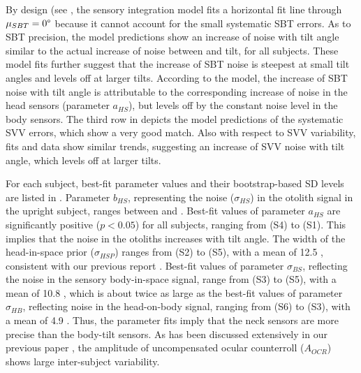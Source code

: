 By design (see , the sensory integration model fits a horizontal fit line through $\mu_{SBT} = 0\degree$ because it cannot account for the small systematic SBT errors. As to SBT precision, the model predictions show an increase of noise with tilt angle similar to the actual increase of noise between  and  tilt, for all subjects. These model fits further suggest that the increase of SBT noise is steepest at small tilt angles and levels off at larger tilts. According to the model, the increase of SBT noise with tilt angle is attributable to the corresponding increase of noise in the head sensors (parameter $a_{HS}$), but levels off by the constant noise level in the body sensors. The third row in  depicts the model predictions of the systematic SVV errors, which show a very good match. Also with respect to SVV variability, fits and data show similar trends, suggesting an increase of SVV noise with tilt angle, which levels off at larger tilts. 

For each subject, best-fit parameter values and their bootstrap-based SD levels are listed in . Parameter $b_{HS}$, representing the noise ($\sigma_{HS}$) in the otolith signal in the upright subject, ranges between  and . Best-fit values of parameter $a_{HS}$ are significantly positive ($p < 0.05$) for all subjects, ranging from  (S4) to  (S1). This implies that the noise in the otoliths increases with tilt angle. The width of the head-in-space prior ($\sigma_{HSP}$) ranges from  (S2) to  (S5), with a mean of 12.5 \textpm {}, consistent with our previous report \cite{devrijer2009}. Best-fit values of parameter $\sigma_{BS}$, reflecting the noise in the sensory body-in-space signal, range from  (S3) to  (S5), with a mean of 10.8 \textpm {}, which is about twice as large as the best-fit values of parameter $\sigma_{HB}$, reflecting noise in the head-on-body signal, ranging from  (S6) to  (S3), with a mean of 4.9 \textdegree. Thus, the parameter fits imply that the neck sensors are more precise than the body-tilt sensors. As has been discussed extensively in our previous paper \cite{devrijer2009}, the amplitude of uncompensated ocular counterroll ($A_{OCR}$) shows large inter-subject variability. 

